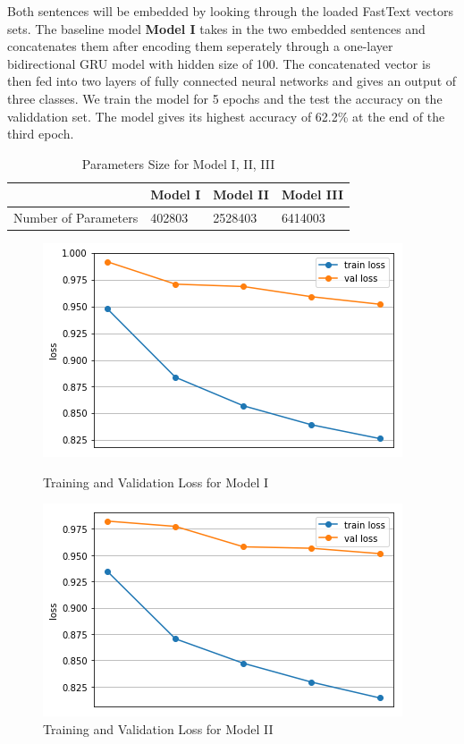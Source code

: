 \documentclass[10pt]{article}
\begin{document}
Both sentences will be embedded by looking through the loaded FastText vectors sets. The baseline model \textbf{Model I} takes in the two embedded sentences and concatenates them after encoding them seperately through a one-layer bidirectional GRU model with hidden size of 100. The concatenated vector is then fed into two layers of fully connected neural networks and gives an output of three classes.  We train the model for 5 epochs and the test the accuracy on the validdation set. The model gives its highest accuracy of 62.2\% at the end of the third epoch. \par

\begin{table}[h]
\centering
\caption{Parameters Size for Model I, II, III}
\label{my-label}
\begin{tabular}{llll}
\hline
                     & Model I & Model II & Model III \\ \hline
Number of Parameters & 402803  & 2528403  & 6414003   \\ \hline
\end{tabular}
\end{table}
\begin{figure}[]
\centering
\begin{minipage}{.4\textwidth}
  \includegraphics[width=\textwidth]{plot5}
  \caption{Training and Validation Loss for Model I}
\end{minipage}%
\hfill
\begin{minipage}{.4\textwidth}
  \includegraphics[width=\textwidth]{plot6}
  \caption{Training and Validation Loss for Model II}
\end{minipage}
\end{figure}
\end{document}
